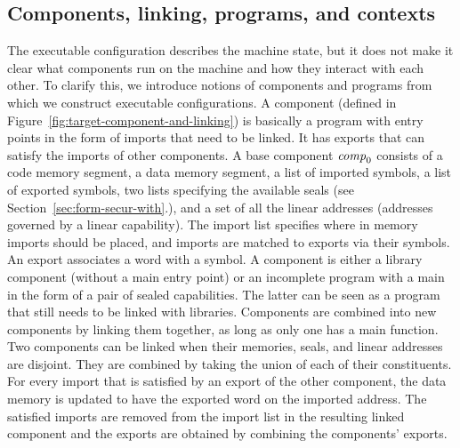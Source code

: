 \documentclass{jfp}
\renewcommand{\comp}{\var{comp}}
\begin{document}
\subsection{Components, linking, programs, and contexts }
\label{subsec:components-linking}
The executable configuration describes the machine state, but it does not make it clear what components run on the machine and how they interact with each other.
To clarify this, we introduce notions of components and programs from which we construct executable configurations.
A component (defined in Figure~\ref{fig:target-component-and-linking}) is basically a program with entry points in the form of imports that need to be linked.
It has exports that can satisfy the imports of other components.
A base component $\comp_0$ consists of a code memory segment, a data memory segment, a list of imported symbols, a list of exported symbols, two lists specifying the available seals (see Section~\ref{sec:form-secur-with}.), and a set of all the linear addresses (addresses governed by a linear capability).
The import list specifies where in memory imports should be placed, and imports are matched to exports via their symbols.
An export associates a word with a symbol.
A component is either a library component (without a main entry point) or an incomplete program with a main in the form of a pair of sealed capabilities.
The latter can be seen as a program that still needs to be linked with libraries.
Components are combined into new components by linking them together, as long as only one has a main function.
Two components can be linked when their memories, seals, and linear addresses are disjoint.
They are combined by taking the union of each of their constituents.
For every import that is satisfied by an export of the other component, the data memory is updated to have the exported word on the imported address.
The satisfied imports are removed from the import list in the resulting linked component and the exports are obtained by combining the components' exports.
\end{document}
